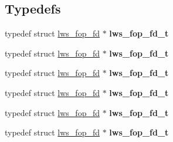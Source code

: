 \subsection*{Typedefs}
\begin{DoxyCompactItemize}
\item 
\mbox{\label{group__fops_gaff2afd0d519127b98def65b1257a0957}} 
typedef struct \hyperlink{structlws__fop__fd}{lws\+\_\+fop\+\_\+fd} $\ast$ {\bfseries lws\+\_\+fop\+\_\+fd\+\_\+t}
\item 
\mbox{\label{group__fops_gaff2afd0d519127b98def65b1257a0957}} 
typedef struct \hyperlink{structlws__fop__fd}{lws\+\_\+fop\+\_\+fd} $\ast$ {\bfseries lws\+\_\+fop\+\_\+fd\+\_\+t}
\item 
\mbox{\label{group__fops_gaff2afd0d519127b98def65b1257a0957}} 
typedef struct \hyperlink{structlws__fop__fd}{lws\+\_\+fop\+\_\+fd} $\ast$ {\bfseries lws\+\_\+fop\+\_\+fd\+\_\+t}
\item 
\mbox{\label{group__fops_gaff2afd0d519127b98def65b1257a0957}} 
typedef struct \hyperlink{structlws__fop__fd}{lws\+\_\+fop\+\_\+fd} $\ast$ {\bfseries lws\+\_\+fop\+\_\+fd\+\_\+t}
\item 
\mbox{\label{group__fops_gaff2afd0d519127b98def65b1257a0957}} 
typedef struct \hyperlink{structlws__fop__fd}{lws\+\_\+fop\+\_\+fd} $\ast$ {\bfseries lws\+\_\+fop\+\_\+fd\+\_\+t}
\item 
\mbox{\label{group__fops_gaff2afd0d519127b98def65b1257a0957}} 
typedef struct \hyperlink{structlws__fop__fd}{lws\+\_\+fop\+\_\+fd} $\ast$ {\bfseries lws\+\_\+fop\+\_\+fd\+\_\+t}
\end{DoxyCompactItemize}
